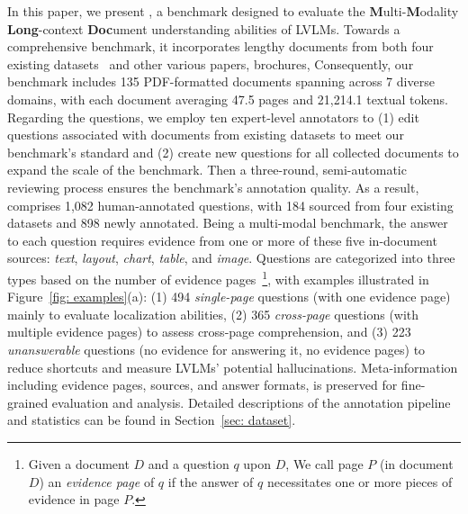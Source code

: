 In this paper, we present \benchmarkname, a benchmark designed to evaluate the \textbf{M}ulti-\textbf{M}odality \textbf{Long}-context \textbf{Doc}ument understanding abilities of LVLMs. Towards a comprehensive benchmark, it incorporates lengthy documents from both four existing datasets~\cite{masry-etal-2022-chartqa, VanLandeghem2023DocumentUD, SlideVQA2023, islam2023financebench} and other various papers, brochures, \etc Consequently, our benchmark includes 135 PDF-formatted documents spanning across 7 diverse domains, with each document averaging 47.5 pages and 21,214.1 textual tokens. Regarding the questions, we employ ten expert-level annotators to (1) edit questions associated with documents from existing datasets to meet our benchmark's standard and (2) create new questions for all collected documents to expand the scale of the benchmark. Then a three-round, semi-automatic reviewing process ensures the benchmark's annotation quality. As a result, \benchmarkname comprises 1,082 human-annotated questions, with 184 sourced from four existing datasets and 898 newly annotated. Being a multi-modal benchmark, the answer to each question requires evidence from one or more of these five in-document sources: \textit{text}, \textit{layout}, \textit{chart}, \textit{table}, and \textit{image}. Questions are categorized into three types based on the number of evidence pages~\footnote{Given a document $D$ and a question $q$ upon $D$, We call page $P$ (in document $D$) an \textit{evidence page} of $q$ if the answer of $q$ necessitates one or more pieces of evidence in page $P$.}, with examples illustrated in Figure~\ref{fig: examples}(a): (1) 494 \textit{single-page} questions (with one evidence page) mainly to evaluate localization abilities, (2) 365 \textit{cross-page} questions (with multiple evidence pages) to assess cross-page comprehension, and (3) 223 \textit{unanswerable} questions (no evidence for answering it, \ie no evidence pages) to reduce shortcuts and measure LVLMs' potential hallucinations. Meta-information including evidence pages, sources, and answer formats, is preserved for fine-grained evaluation and analysis. Detailed descriptions of the annotation pipeline and statistics can be found in Section~\ref{sec: dataset}.

